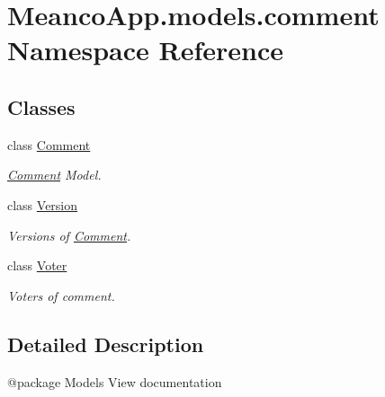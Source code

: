 \hypertarget{namespace_meanco_app_1_1models_1_1comment}{}\section{Meanco\+App.\+models.\+comment Namespace Reference}
\label{namespace_meanco_app_1_1models_1_1comment}
\subsection*{Classes}
\begin{DoxyCompactItemize}
\item 
class \hyperlink{class_meanco_app_1_1models_1_1comment_1_1_comment}{Comment}
\begin{DoxyCompactList}\small\item\em \hyperlink{class_meanco_app_1_1models_1_1comment_1_1_comment}{Comment} Model. \end{DoxyCompactList}\item 
class \hyperlink{class_meanco_app_1_1models_1_1comment_1_1_version}{Version}
\begin{DoxyCompactList}\small\item\em Versions of \hyperlink{class_meanco_app_1_1models_1_1comment_1_1_comment}{Comment}. \end{DoxyCompactList}\item 
class \hyperlink{class_meanco_app_1_1models_1_1comment_1_1_voter}{Voter}
\begin{DoxyCompactList}\small\item\em Voters of comment. \end{DoxyCompactList}\end{DoxyCompactItemize}


\subsection{Detailed Description}
\begin{DoxyVerb}@package Models
View documentation\end{DoxyVerb}
 